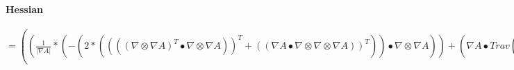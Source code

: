 \documentclass{article}
\begin{document}
\paragraph{Hessian}
$= (( \frac{1}{| \nabla A|}*(-{(2*(((( \nabla  \otimes  \nabla A)^T \bullet  \nabla  \otimes  \nabla A))^T+(( \nabla A \bullet  \nabla  \otimes  \nabla  \otimes  \nabla A))^T))} \bullet  \nabla  \otimes  \nabla A))+( \nabla A \bullet Trav((Trav((( \frac{(-1*( \nabla A \bullet  \nabla  \otimes  \nabla A))}{(| \nabla A|*( \nabla A \bullet  \nabla A))}*-{(2*(((( \nabla  \otimes  \nabla A)^T \bullet  \nabla  \otimes  \nabla A))^T+(( \nabla A \bullet  \nabla  \otimes  \nabla  \otimes  \nabla A))^T))})))<1,0,:>+( \frac{1}{| \nabla A|}*-{(2*(Trav((( \nabla  \otimes  \nabla A)^T \bullet  \nabla  \otimes  \nabla  \otimes  \nabla A))<:,2,1>+Trav((( \nabla  \otimes  \nabla A)^T \bullet  \nabla  \otimes  \nabla  \otimes  \nabla A))<1,2,0>+Trav((Trav( \nabla  \otimes  \nabla  \otimes  \nabla A)<2,1,0> \bullet  \nabla  \otimes  \nabla A))<1,2,0>+Trav(( \nabla A \bullet  \nabla  \otimes  \nabla  \otimes  \nabla  \otimes  \nabla A))<1,2,0>))})))<1,2,0>)+(((( \frac{1}{| \nabla A|}* \nabla  \otimes  \nabla A))^T+(( \frac{(-1*( \nabla A \bullet  \nabla  \otimes  \nabla A))}{(| \nabla A|*( \nabla A \bullet  \nabla A))}* \nabla A))) \bullet (-{(2*(((( \nabla  \otimes  \nabla A)^T \bullet  \nabla  \otimes  \nabla A))^T+(( \nabla A \bullet  \nabla  \otimes  \nabla  \otimes  \nabla A))^T))})^T)+(-{(2*( \nabla A \bullet  \nabla  \otimes  \nabla A))} \bullet Trav((Trav((( \frac{(-1*( \nabla A \bullet  \nabla  \otimes  \nabla A))}{(| \nabla A|*( \nabla A \bullet  \nabla A))}* \nabla  \otimes  \nabla A)))<2,0,1>+Trav(( \frac{1}{| \nabla A|}* \nabla  \otimes  \nabla  \otimes  \nabla A))<1,2,0>+Trav((( \nabla  \otimes  \nabla A* \frac{(-1*( \nabla A \bullet  \nabla  \otimes  \nabla A))}{(| \nabla A|*( \nabla A \bullet  \nabla A))})))<2,:,0>+(( \frac{((-1*| \nabla A|*( \nabla A \bullet  \nabla A)*((( \nabla  \otimes  \nabla A)^T \bullet  \nabla  \otimes  \nabla A)+( \nabla A \bullet  \nabla  \otimes  \nabla  \otimes  \nabla A)))-((-1*(((( \nabla A \bullet  \nabla A)* \frac{( \nabla A \bullet  \nabla  \otimes  \nabla A)}{| \nabla A|})+(2*| \nabla A|*( \nabla A \bullet  \nabla  \otimes  \nabla A)))*( \nabla A \bullet  \nabla  \otimes  \nabla A))))^T)}{(| \nabla A|*( \nabla A \bullet  \nabla A)*| \nabla A|*( \nabla A \bullet  \nabla A))}* \nabla A))))<1,2,0>))$
 \\
\end{document}
